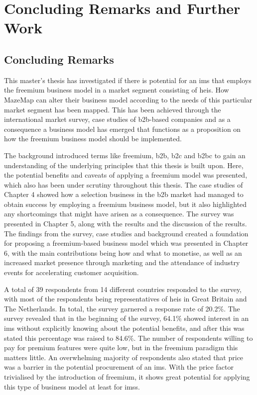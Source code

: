 \chapter{Concluding Remarks and Further Work}
\section{Concluding Remarks}
This master's thesis has investigated if there is potential for an \gls{ims} that employs the freemium business model in a market segment consisting of \glspl{hei}. How MazeMap can alter their business model according to the needs of this particular market segment has been mapped. This has been achieved through the international market survey, case studies of \gls{b2b}-based companies and as a consequence a business model has emerged that functions as a proposition on how the freemium business model should be implemented. 


The background introduced terms like freemium, \gls{b2b}, \gls{b2c} and \gls{b2bc} to gain an understanding of the underlying principles that this thesis is built upon. Here, the potential benefits and caveats of applying a freemium model was presented, which also has been under scrutiny throughout this thesis. The case studies of Chapter 4 showed how a selection business in the \gls{b2b} market had managed to obtain success by employing a freemium business model, but it also highlighted any shortcomings that might have arisen as a consequence. The survey was presented in Chapter 5, along with the results and the discussion of the results. The findings from the survey, case studies and background created a foundation for proposing a freemium-based business model which was presented in Chapter 6, with the main contributions being how and what to monetise, as well as an increased market presence through marketing and the attendance of industry events for accelerating customer acquisition. 


A total of 39 respondents from 14 different countries responded to the survey, with most of the respondents being representatives of \glspl{hei} in Great Britain and The Netherlands. In total, the survey garnered a response rate of 20.2\%. The survey revealed that in the beginning of the survey, 64.1\% showed interest in an \gls{ims} without explicitly knowing about the potential benefits, and after this was stated this percentage was raised to 84.6\%. The number of respondents willing to pay for premium features were quite low, but in the freemium paradigm this matters little. An overwhelming majority of respondents also stated that price was a barrier in the potential procurement of an \gls{ims}. With the price factor trivialised by the introduction of freemium, it shows great potential for applying this type of business model at least for \glspl{ims}.


